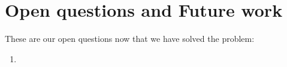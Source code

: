 \documentclass{article}
\begin{document}
\section{Open questions and Future work}
These are our open questions now that we have solved the problem:

\begin{enumerate}
	\item 
\end{enumerate}



 




\end{document}
